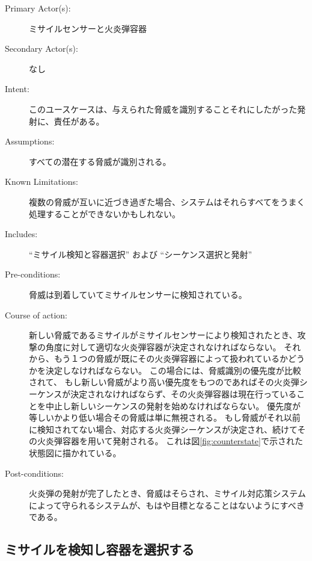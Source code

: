 \documentclass[\pformat,12pt]{jreport}
\begin{document}
\begin{description}
\item[Primary Actor(s):] ミサイルセンサーと火炎弾容器
\item[Secondary Actor(s):] なし
\item[Intent:] このユースケースは、与えられた脅威を識別することそれにしたがった発射に、責任がある。
\item[Assumptions:] すべての潜在する脅威が識別される。
\item[Known Limitations:] 複数の脅威が互いに近づき過ぎた場合、システムはそれらすべてをうまく処理することができないかもしれない。
\item[Includes:] ``ミサイル検知と容器選択'' および ``シーケンス選択と発射''
\item[Pre-conditions:] 脅威は到着していてミサイルセンサーに検知されている。
\item[Course of action:] 新しい脅威であるミサイルがミサイルセンサーにより検知されたとき、攻撃の角度に対して適切な火炎弾容器が決定されなければならない。
それから、もう１つの脅威が既にその火炎弾容器によって扱われているかどうかを決定しなければならない。
この場合には、脅威識別の優先度が比較されて、
もし新しい脅威がより高い優先度をもつのであればその火炎弾シーケンスが決定されなければならず、その火炎弾容器は現在行っていることを中止し新しいシーケンスの発射を始めなければならない。
優先度が等しいかより低い場合その脅威は単に無視される。
もし脅威がそれ以前に検知されてない場合、対応する火炎弾シーケンスが決定され、続けてその火炎弾容器を用いて発射される。
これは図\ref{fig:counterstate}で示された状態図に描かれている。
\item[Post-conditions:] 火炎弾の発射が完了したとき、脅威はそらされ、ミサイル対応策システムによって守られるシステムが、もはや目標となることはないようにすべきである。
\end{description}

\subsection{ミサイルを検知し容器を選択する}
\end{document}
